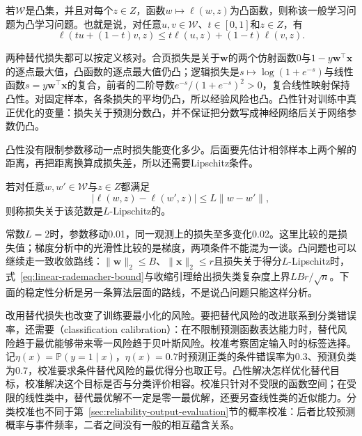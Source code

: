 \begin{definition}[凸学习问题]
\label{def:convex-learning-problem}
若$\mathcal W$是凸集，并且对每个$z\in Z$，函数$w\mapsto\ell(w,z)$为凸函数，则称该一般学习问题为凸学习问题。也就是说，对任意$u,v\in\mathcal W$、$t\in[0,1]$和$z\in Z$，有
\[
 \ell(tu+(1-t)v,z)\leq t\ell(u,z)+(1-t)\ell(v,z).
\]
\end{definition}

两种替代损失都可以按定义核对。合页损失是关于$\bm w$的两个仿射函数$0$与$1-y\bm w^\top\bm x$的逐点最大值，凸函数的逐点最大值仍凸；逻辑损失是$s\mapsto\log(1+e^{-s})$与线性函数$s=y\bm w^\top\bm x$的复合，前者的二阶导数$e^{-s}/(1+e^{-s})^2>0$，复合线性映射保持凸性。对固定样本，各条损失的平均仍凸，所以经验风险也凸。凸性针对训练中真正优化的变量：损失关于预测分数凸，并不保证把分数写成神经网络后关于网络参数仍凸。

凸性没有限制参数移动一点时损失能变化多少。后面要先估计相邻样本上两个解的距离，再把距离换算成损失差，所以还需要Lipschitz条件。

\begin{definition}[Lipschitz损失]
\label{def:lipschitz-loss}
若对任意$w,w'\in\mathcal W$与$z\in Z$都满足
\begin{equation}
 |\ell(w,z)-\ell(w',z)|\leq L\|w-w'\|,
 \label{eq:lipschitz-loss}
\end{equation}
则称损失关于该范数是$L$-Lipschitz的。
\end{definition}

常数$L=2$时，参数移动0.01，同一观测上的损失至多变化0.02。这里比较的是损失值；梯度分析中的光滑性比较的是梯度，两项条件不能混为一谈。凸问题也可以继续走一致收敛路线：$\|\bm w\|_2\leq B$、$\|\bm x\|_2\leq r$且损失关于得分$L$-Lipschitz时，式~\eqref{eq:linear-rademacher-bound}与收缩引理给出损失类复杂度上界$LBr/\sqrt n$。下面的稳定性分析是另一条算法层面的路线，不是说凸问题只能这样分析。

改用替代损失也改变了训练要最小化的风险。要把替代风险的改进联系到分类错误率，还需要（classification calibration）：在不限制预测函数表达能力时，替代风险趋于最优能够带来零一风险趋于贝叶斯风险。校准考察固定输入时的标签选择。记$\eta(x)=\mathbb P(y=1\mid x)$，$\eta(x)=0.7$时预测正类的条件错误率为0.3、预测负类为0.7，校准要求条件替代风险的最优得分也取正号。凸性解决怎样优化替代目标，校准解决这个目标是否与分类评价相容。校准只针对不受限的函数空间；在受限的线性类中，替代最优解不一定是零一最优解，还要另查线性类的近似能力。分类校准也不同于第~\ref{sec:reliability-output-evaluation}节的概率校准：后者比较预测概率与事件频率，二者之间没有一般的相互蕴含关系。

